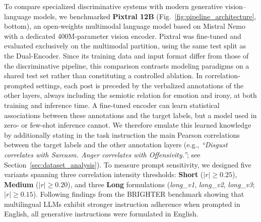 To compare specialized discriminative systems with modern generative vision--language models, we benchmarked \textbf{Pixtral 12B} \cite{pixtral} (Fig.~\ref{fig:pipeline_architecture}, bottom), an open-weights multimodal language model based on Mistral Nemo with a dedicated 400M-parameter vision encoder. Pixtral was fine-tuned and evaluated exclusively on the multimodal partition, using the same test split as the Dual-Encoder. Since its training data and input format differ from those of the discriminative pipeline, this comparison contrasts modeling paradigms on a shared test set rather than constituting a controlled ablation. In correlation-prompted settings, each post is preceded by the verbalized annotations of the other layers, always including the semiotic relation for emotion and irony, at both training and inference time. A fine-tuned encoder can learn statistical associations between these annotations and the target labels, but a model used in zero- or few-shot inference cannot. We therefore emulate this learned knowledge by additionally stating in the task instruction the main Pearson correlations between the target labels and the other annotation layers (e.g., \textit{``Disgust correlates with Sarcasm. Anger correlates with Offensivity.''}; see Section~\ref{sec:dataset_analysis}). To measure prompt sensitivity, we designed five variants spanning three correlation intensity thresholds: \textbf{Short} ($|r| \ge 0.25$), \textbf{Medium} ($|r| \ge 0.20$), and three \textbf{Long} formulations (\textit{long\_v1}, \textit{long\_v2}, \textit{long\_v3}; $|r| \ge 0.15$). Following findings from the BRIGHTER benchmark \cite{brighter_project} showing that multilingual LLMs exhibit stronger instruction adherence when prompted in English, all generative instructions were formulated in English.

